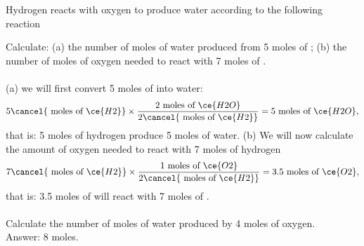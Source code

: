 \documentclass[main.tex]{subfiles}
\begin{document}
\begin{description}
\begin{example} %
Hydrogen reacts with oxygen to produce water according to the following reaction
\begin{center}\end{center}
Calculate: (a) the number of moles of water produced from 5 moles of ; (b) the number of moles of oxygen needed to react with 7 moles of .\\
\\
(a) we will first convert 5 moles of  into water:
\begin{equation*}
5\cancel{\text{ moles of }\ce{H2}} \times \dfrac{\text{2 moles of }\ce{H2O}}{2\cancel{\text{ moles of }\ce{H2}}}=5\text{ moles of }\ce{H2O},
\end{equation*}
that is: 5 moles of hydrogen produce 5 moles of water.
(b) We will now calculate the amount of oxygen needed to react with 7 moles of hydrogen
\begin{equation*}
7\cancel{\text{ moles of }\ce{H2}} \times \dfrac{\text{1 moles of }\ce{O2}}{2\cancel{\text{ moles of }\ce{H2}}}=3.5\text{ moles of }\ce{O2},
\end{equation*}
that is: 3.5 moles of  will react with 7 moles of .
\\
\faDiamond\ \\
Calculate the number of moles of water produced by 4 moles of oxygen. \\
\flushright Answer: 8 moles.
\end{example}%


\end{description}
\end{document}

